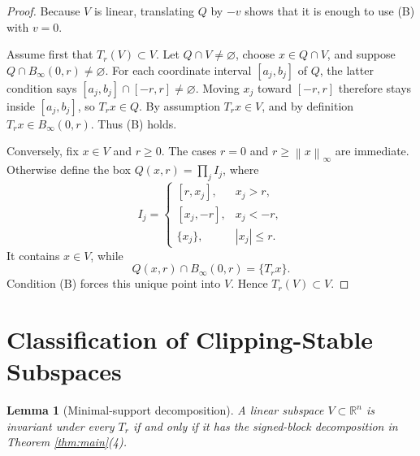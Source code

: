 \documentclass[11pt]{article}
\newtheorem{lemma}{Lemma}
\theoremstyle{definition}
\newcommand{\R}{\mathbb R}
\newcommand{\norm}[1]{\left\lVert #1\right\rVert_\infty}
\begin{document}
\begin{proof}
Because \(V\) is linear, translating \(Q\) by \(-v\) shows that it is enough
to use (B) with \(v=0\).

Assume first that \(T_r(V)\subset V\).  Let \(Q\cap V\ne\varnothing\), choose
\(x\in Q\cap V\), and suppose \(Q\cap B_\infty(0,r)\ne\varnothing\).  For
each coordinate interval \([a_j,b_j]\) of \(Q\), the latter condition says
\([a_j,b_j]\cap[-r,r]\ne\varnothing\).  Moving \(x_j\) toward
\([-r,r]\) therefore stays inside \([a_j,b_j]\), so \(T_r x\in Q\).
By assumption \(T_r x\in V\), and by definition \(T_r x\in B_\infty(0,r)\).
Thus (B) holds.

Conversely, fix \(x\in V\) and \(r\ge0\).  The cases \(r=0\) and
\(r\ge\norm{x}\) are immediate.  Otherwise define the box
\(Q(x,r)=\prod_j I_j\), where
\[
 I_j=
 \begin{cases}
 [r,x_j],&x_j>r,\\
 [x_j,-r],&x_j<-r,\\
 \{x_j\},&|x_j|\le r.
 \end{cases}
\]
It contains \(x\in V\), while
\[
 Q(x,r)\cap B_\infty(0,r)=\{T_r x\}.
\]
Condition (B) forces this unique point into \(V\).  Hence \(T_r(V)\subset V\).
\end{proof}

\section{Classification of Clipping-Stable Subspaces}

\begin{lemma}[Minimal-support decomposition]\label{lem:structure}
A linear subspace \(V\subset\R^n\) is invariant under every \(T_r\) if and
only if it has the signed-block decomposition in Theorem \ref{thm:main}(4).
\end{lemma}
\end{document}
